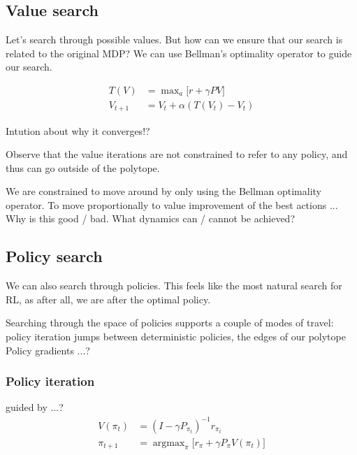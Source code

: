 \subsection{Value search}

Let's search through possible values. But how can we ensure that our search is
related to the original MDP? We can use Bellman's optimality operator to guide our search.


\begin{align}
T(V) &= \mathop{\text{max}}_a \big[r + \gamma PV\big] \\
V_{t+1} &= V_t + \alpha (T(V_t) - V_t)
\end{align}

Intution about why it converges!?


Observe that the value iterations are not constrained to refer to any policy,
and thus can go outside of the polytope. \cite{Dadashi2018}

We are constrained to move around by only using the Bellman optimality operator.
To move proportionally to value improvement of the best actions ...
Why is this good / bad. What dynamics can / cannot be achieved?

\subsection{Policy search}

We can also search through policies. This feels like the most natural search for RL,
as after all, we are after the optimal policy.

Searching through the space of policies supports a couple of modes of travel:
policy iteration jumps between deterministic policies, the edges of our polytope
Policy gradients ...?

\subsubsection{Policy iteration}

guided by ...?
\begin{align}
V(\pi_t) &=  (I - \gamma P_{\pi_t})^{-1} r_{\pi_t} \\
\pi_{t+1} &= \mathop{\text{argmax}}_\pi \big[r_{\pi} + \gamma P_{\pi}V(\pi_t) \big]
\end{align}


